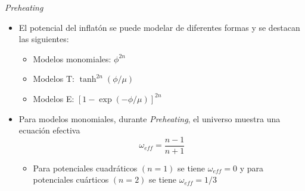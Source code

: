 \documentclass{beamer}
\begin{document}
            \begin{frame}{\textit{Preheating}}
                \begin{itemize}
                    \item[\textcolor{brown}{$\bullet$}] El potencial del inflatón se puede modelar de diferentes formas y se destacan las siguientes:
                        \begin{itemize}
                            \item[\textcolor{cyan}{$\bullet$}] Modelos monomiales: $\phi^{2n}$
                            \item[\textcolor{cyan}{$\bullet$}] Modelos T: $\tanh^{2n} (\phi/\mu)$
                            \item[\textcolor{cyan}{$\bullet$}] Modelos E: $[1 - \exp (-\phi/\mu)]^{2n}$
                        \end{itemize}

                        \vspace{0.5cm}

                    \item[\textcolor{brown}{$\bullet$}] Para modelos monomiales, durante \textit{Preheating}, el universo muestra una ecuación efectiva
                        \begin{equation*}
                            \omega_{eff} = \frac{n - 1}{n + 1}
                        \end{equation*}
                        \begin{itemize}
                            \item[\textcolor{cyan}{$\bullet$}] Para potenciales cuadráticos $(n = 1)$ se tiene $\omega_{eff} = 0$ y para potenciales cuárticos $(n = 2)$ se tiene $\omega_{eff} = 1/3$
                        \end{itemize}
                \end{itemize}
            \end{frame}
\end{document}
